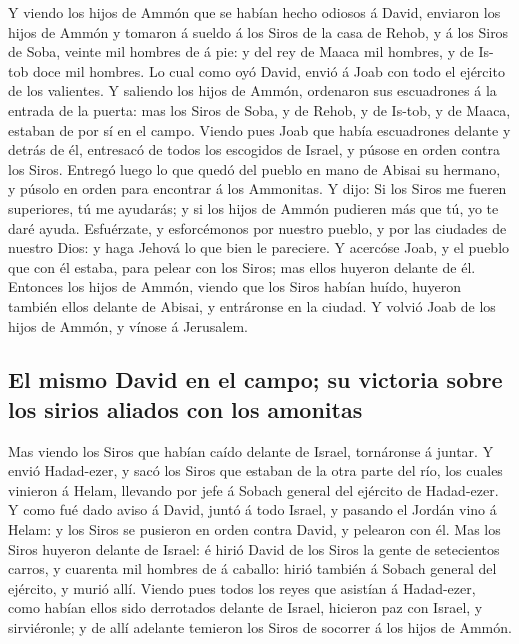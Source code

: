  Y viendo los hijos de Ammón que se habían hecho odiosos á
David, enviaron los hijos de Ammón y tomaron á sueldo á los Siros de la
casa de Rehob, y á los Siros de Soba, veinte mil hombres de á pie: y del
rey de Maaca mil hombres, y de Is-tob doce mil hombres. 
Lo cual como oyó David, envió á Joab con todo el ejército de los
valientes.  Y saliendo los hijos de Ammón, ordenaron sus
escuadrones á la entrada de la puerta: mas los Siros de Soba, y de
Rehob, y de Is-tob, y de Maaca, estaban de por sí en el campo.
 Viendo pues Joab que había escuadrones delante y detrás
de él, entresacó de todos los escogidos de Israel, y púsose en orden
contra los Siros.  Entregó luego lo que quedó del pueblo
en mano de Abisai su hermano, y púsolo en orden para encontrar á los
Ammonitas.  Y dijo: Si los Siros me fueren superiores, tú
me ayudarás; y si los hijos de Ammón pudieren más que tú, yo te daré
ayuda.  Esfuérzate, y esforcémonos por nuestro pueblo, y
por las ciudades de nuestro Dios: y haga Jehová lo que bien le
pareciere.  Y acercóse Joab, y el pueblo que con él
estaba, para pelear con los Siros; mas ellos huyeron delante de él.
 Entonces los hijos de Ammón, viendo que los Siros habían
huído, huyeron también ellos delante de Abisai, y entráronse en la
ciudad. Y volvió Joab de los hijos de Ammón, y vínose á Jerusalem.

\hypertarget{el-mismo-david-en-el-campo-su-victoria-sobre-los-sirios-aliados-con-los-amonitas}{%
\subsection{El mismo David en el campo; su victoria sobre los sirios
aliados con los
amonitas}\label{el-mismo-david-en-el-campo-su-victoria-sobre-los-sirios-aliados-con-los-amonitas}}

 Mas viendo los Siros que habían caído delante de Israel,
tornáronse á juntar.  Y envió Hadad-ezer, y sacó los
Siros que estaban de la otra parte del río, los cuales vinieron á Helam,
llevando por jefe á Sobach general del ejército de Hadad-ezer.
 Y como fué dado aviso á David, juntó á todo Israel, y
pasando el Jordán vino á Helam: y los Siros se pusieron en orden contra
David, y pelearon con él.  Mas los Siros huyeron delante
de Israel: é hirió David de los Siros la gente de setecientos carros, y
cuarenta mil hombres de á caballo: hirió también á Sobach general del
ejército, y murió allí.  Viendo pues todos los reyes que
asistían á Hadad-ezer, como habían ellos sido derrotados delante de
Israel, hicieron paz con Israel, y sirviéronle; y de allí adelante
temieron los Siros de socorrer á los hijos de Ammón.

